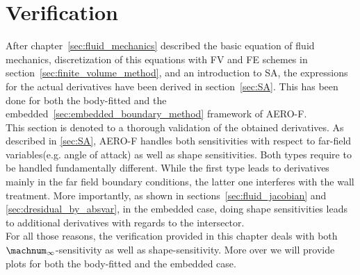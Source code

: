 \documentclass[../main.tex]{subfiles}
\begin{document}
\setlength{\delimitershortfall}{0pt}

\section{Verification}\label{sec:verification}
After chapter~\ref{sec:fluid_mechanics} described the basic equation of fluid mechanics, discretization of this equations with \ac{FV} and \ac{FE} schemes in section~\ref{sec:finite_volume_method}, and an introduction to \ac{SA}, the expressions for the actual derivatives have been derived in section~\ref{sec:SA}. This has been done for both the body-fitted and the embedded~\ref{sec:embedded_boundary_method} framework of AERO-F.\\
This section is denoted to a thorough validation of the obtained derivatives. As described in \ref{sec:SA}, AERO-F handles both sensitivities with respect to far-field variables(e.g. angle of attack) as well as shape sensitivities. Both types require to be handled fundamentally different. While the first type leads to derivatives mainly in the far field boundary conditions, the latter one interferes with the wall treatment. More importantly, as shown in sections~\ref{sec:fluid_jacobian} and \ref{sec:dresidual_by_absvar}, in the embedded case, doing shape sensitivities leads to additional derivatives with regards to the intersector.\\
For all those reasons, the verification provided in this chapter deals with both $\machnum_{\infty}$-sensitivity as well as shape-sensitivity. More over we will provide plots for both the body-fitted and the embedded case.
\end{document}
